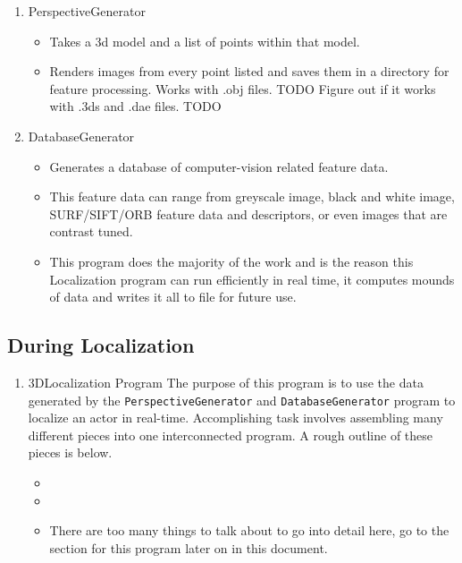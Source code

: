 \documentclass[a4paper,11pt]{article}
\begin{document}
        \begin{enumerate}
        \item PerspectiveGenerator
            \begin{itemize}
            \item Takes a 3d model and a list of points within that model.
            \item Renders images from every point listed and saves them in a directory for feature processing. Works with .obj files. TODO Figure out if it works with .3ds and .dae files. TODO
            \end{itemize}
        \item DatabaseGenerator
            \begin{itemize}
            \item Generates a database of computer-vision related feature data.
            \item This feature data can range from greyscale image, black and white image, SURF/SIFT/ORB feature data and descriptors, or even images that are contrast tuned.
            \item This program does the majority of the work and is the reason this Localization program can run efficiently in real time, it computes mounds of data and writes it all to file for future use.
            \end{itemize}
        \end{enumerate}
  
        \subsection{During Localization}
        \begin{enumerate}
        \item 3DLocalization Program
        The purpose of this program is to use the data generated by the \texttt{PerspectiveGenerator} and \texttt{DatabaseGenerator} program to localize an actor in real-time. Accomplishing task involves assembling many different pieces into one interconnected program. A rough outline of these pieces is below.
            \begin{itemize}
            \item 
            \item 
            \item There are too many things to talk about to go into detail here, go to the section for this program later on in this document.
            \end{itemize}
        \end{enumerate}
        \newpage
\end{document}
